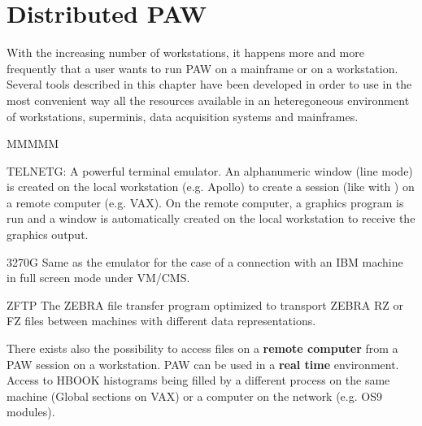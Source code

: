 
\chapter{Distributed PAW}
\label{sec:H1DIST}
 
With the increasing number of workstations, it happens more and more
frequently that a user wants to run PAW on a mainframe
or on a workstation.
Several tools described in this chapter have been developed in order to use
in the most convenient way all the resources available in an heteregoneous
environment of workstations, superminis, data acquisition systems
and mainframes.
 
\begin{DL}{MMMMM}
\item[TELNETG:]A powerful terminal emulator. An alphanumeric window (line mode)
is created on the local workstation (e.g. Apollo)
to create a session (like with )
on a remote computer (e.g. VAX). On the remote computer, a graphics program
is run and a window is automatically created on the local workstation
to receive the graphics output.
\item[3270G
]Same as the  emulator for the case of a connection
with an IBM machine in full screen mode under VM/CMS.
\item[ZFTP
]The ZEBRA file transfer program optimized to transport ZEBRA
RZ or FZ files between machines with different data representations.
\end{DL}
 
There exists also the possibility to access files on a {\bf remote computer}
from a PAW session on a workstation.
PAW can be used in a {\bf real time} environment.
Access to HBOOK histograms being filled
by a different process on the same machine (Global sections on VAX) or a
computer on the network (e.g. OS9 modules).
 
